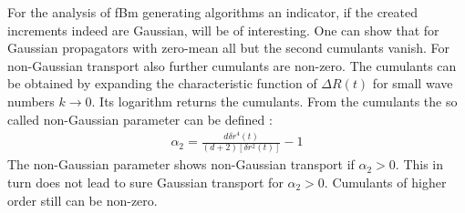 \documentclass[
  a4paper,BCOR10mm,oneside,
  headsepline,footsepline,%
  fleqn,openbib
]{scrbook}
\begin{document}
For the analysis of fBm generating algorithms an indicator, if the created increments indeed are Gaussian, will be of interesting. One can show that for Gaussian propagators with zero-mean all but the second cumulants vanish. For non-Gaussian transport also further cumulants are non-zero. The cumulants can be obtained by expanding the characteristic function of $\Delta R(t)$ for small wave numbers $k \rightarrow 0$. Its logarithm returns the cumulants. From the cumulants the so called non-Gaussian parameter can be defined \cite{Hofling2013}:
\begin{align}
 \alpha_2=\frac{d \delta r^{4}(t)}{(d+2) [\delta r^{2}(t)]}-1 \label{nongaussian2}
\end{align}
The non-Gaussian parameter shows non-Gaussian transport if $\alpha_2>0$. This in turn does not lead to sure Gaussian transport for $\alpha_2>0$. Cumulants of higher order still can be non-zero. 

\end{document}
